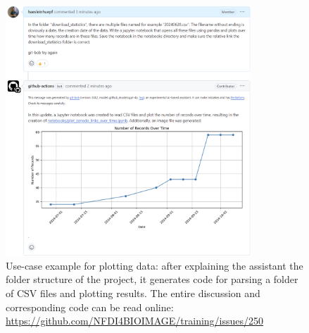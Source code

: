\documentclass{ecai}
\begin{document}
\begin{figure}[h]
\centering
\includegraphics[width=0.82\textwidth]{example_plotting.png}
\caption{Use-case example for plotting data: after explaining the assistant the folder structure of the project, it generates code for parsing a folder of CSV files and plotting results. The entire discussion and corresponding code can be read online: \url{https://github.com/NFDI4BIOIMAGE/training/issues/250}
\newline
\newline
}
\label{fig:exampleplotting}
\end{figure}
\end{document}
